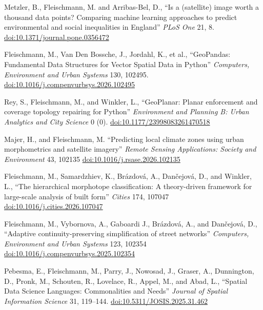 \documentclass[12pt,a4paper]{report}
\begin{document}
    \begin{tablist}
        
        \item[2026] \tab{}Metzler, B., Fleischmann, M. and Arribas-Bel, D., \enquote{Is a (satellite) image worth a thousand data points? Comparing machine learning approaches to predict environmental and social inequalities in England} \textit{PLoS One} 21, 8. \href{https://doi.org/10.1371/journal.pone.0356472}{doi:10.1371/journal.pone.0356472}

        \item[2026] \tab{}Fleischmann, M., Van Den Bossche, J., Jordahl, K., et al., \enquote{GeoPandas: Fundamental Data Structures for Vector Spatial Data in Python} \textit{Computers, Environment and Urban Systems} 130, 102495. \href{https://doi.org/10.1016/j.compenvurbsys.2026.102495}{doi:10.1016/j.compenvurbsys.2026.102495}

        \item[2026] \tab{}Rey, S., Fleischmann, M., and Winkler, L., \enquote{GeoPlanar: Planar enforcement and coverage topology repairing for Python} \textit{Environment and Planning B: Urban Analytics and City Science} 0 (0). \href{https://doi.org/10.1177/23998083261470518}{doi:10.1177/23998083261470518}

        \item[2026] \tab{}Majer, H., and Fleischmann, M. \enquote{Predicting local climate zones using urban morphometrics and satellite imagery} \textit{Remote Sensing Applications: Society and Environment} 43, 102135 \href{https://doi.org/10.1016/j.rsase.2026.102135}{doi:10.1016/j.rsase.2026.102135}

        \item[2026] \tab{}Fleischmann, M., Samardzhiev, K., Brázdová, A., Dančejová, D., and Winkler, L., \enquote{The hierarchical morphotope classification: A theory-driven framework for large-scale analysis of built form} \textit{Cities} 174, 107047 \href{https://doi.org/10.1016/j.cities.2026.107047}{doi:10.1016/j.cities.2026.107047}

        \item[2026] \tab{}Fleischmann, M., Vybornova, A., Gaboardi J., Brázdová, A., and Dančejová, D., \enquote{Adaptive continuity-preserving simplification of street networks} \textit{Computers, Environment and Urban Systems} 123, 102354 \href{https://doi.org/10.1016/j.compenvurbsys.2025.102354}{doi:10.1016/j.compenvurbsys.2025.102354}

        \item[2025] \tab{}Pebesma, E., Fleischmann, M., Parry, J., Nowosad, J., Graser, A., Dunnington, D., Pronk, M., Schouten, R., Lovelace, R., Appel, M., and Abad, L., \enquote{Spatial Data Science Languages: Commonalities and Needs} \textit{Journal of Spatial Information Science} 31, 119--144. \href{https://doi.org/10.5311/JOSIS.2025.31.462}{doi:10.5311/JOSIS.2025.31.462}


\end{tablist}
\end{document}
